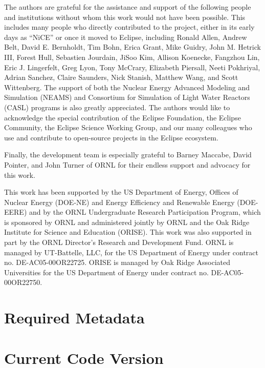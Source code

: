 The authors are grateful for the assistance and support of the following
people and institutions without whom this work would not have been
possible. This includes many people who directly contributed to the
project, either in its early days as ``NiCE'' or once it moved to
Eclipse, including Ronald Allen, Andrew Belt, David E.
Bernholdt, Tim Bohn, Erica Grant, Mike Guidry, John M. Hetrick III, Forest Hull, 
Sebastien Jourdain, JiSoo Kim, Allison Koenecke, Fangzhou Lin, Eric J. Lingerfelt, Greg
Lyon, Tony McCrary, Elizabeth Piersall, Neeti
Pokhriyal, Adrian Sanchez, Claire Saunders, Nick Stanish, Matthew Wang, and
Scott Wittenberg. The support of both the Nuclear Energy Advanced Modeling and Simulation (NEAMS) and Consortium for Simulation of Light Water Reactors (CASL) programs is also
greatly appreciated. The authors would like to acknowledge the special
contribution of the Eclipse Foundation, the Eclipse Community, the
Eclipse Science Working Group, and our many colleagues who use and
contribute to open-source projects in the Eclipse ecosystem.

Finally, the development team is especially grateful to Barney Maccabe,
David Pointer, and John Turner of ORNL for their
endless support and advocacy for this work.

This work has been supported by the US Department of Energy, Offices of
Nuclear Energy (DOE-NE) and Energy Efficiency and Renewable Energy
(DOE-EERE) and by the ORNL Undergraduate Research Participation
Program, which is sponsored by ORNL and administered jointly by ORNL and
the Oak Ridge Institute for Science and Education (ORISE). This work was
also supported in part by the ORNL Director's
Research and Development Fund. ORNL is managed by UT-Battelle, LLC, for
the US Department of Energy under contract no. DE-AC05-00OR22725. ORISE
is managed by Oak Ridge Associated Universities for the US Department of
Energy under contract no. DE-AC05-00OR22750.

\section*{Required Metadata}\label{required-metadata}

\section*{Current Code Version}\label{current-code-version}

